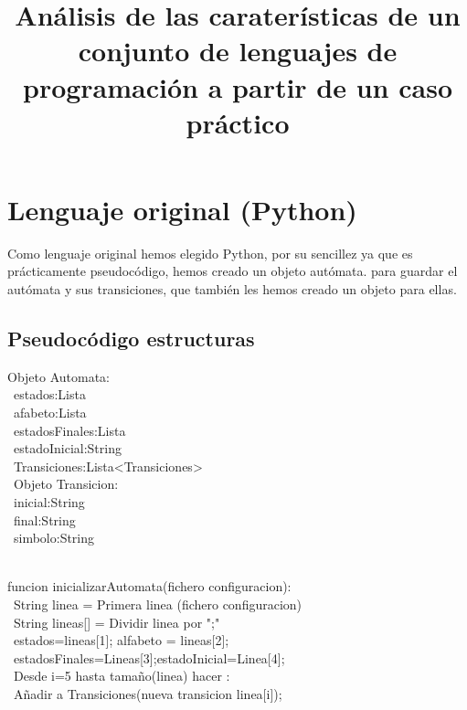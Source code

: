 \documentclass[]{scrartcl}
\title{An\'alisis de las carater\'isticas de un conjunto de lenguajes de programaci\'on a partir de un caso pr\'actico}
\author{}
\begin{document}
\maketitle

\begin{abstract}

\end{abstract}

\section{Lenguaje original (Python)}
Como lenguaje original hemos elegido Python, por su sencillez ya que es pr\'acticamente pseudoc\'odigo, hemos creado un objeto aut\'omata. para guardar el aut\'omata y sus transiciones, que tambi\'en les hemos creado un objeto para ellas.
\subsection{Pseudocódigo estructuras}
Objeto Automata:\\ \
\indent estados:Lista\\ \
\indent	afabeto:Lista\\ \
\indent	estadosFinales:Lista\\ \
\indent	estadoInicial:String\\ \
\indent	Transiciones:Lista<Transiciones>\\ \
Objeto Transicion: \\ \
\indent	inicial:String\\ \
\indent	final:String\\ \
\indent	simbolo:String\\ \

funcion inicializarAutomata(fichero configuracion):\\ \
\indent	String linea = Primera linea (fichero configuracion)\\ \
\indent	String lineas[] = Dividir linea por ";"\\ \
\indent	estados=lineas[1]; alfabeto = lineas[2];\\ \
\indent	estadosFinales=Lineas[3];estadoInicial=Linea[4];\\ \
\indent	Desde i=5 hasta tamaño(linea) hacer :\\ \
\indent\indent	Añadir a Transiciones(nueva transicion linea[i]);\\ \
\end{document}
